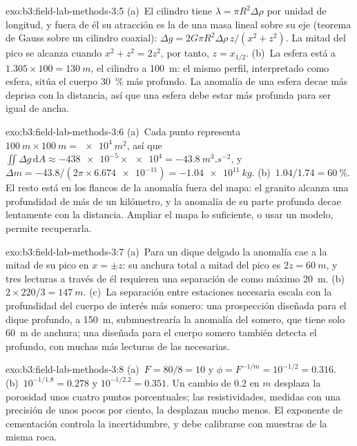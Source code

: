 \begin{solution}{exo:b3:field-lab-methods-3:5}
(a)~El cilindro tiene $\lambda = \pi R^2\Delta\rho$ por unidad de longitud, y
fuera de él su atracción es la de una masa lineal sobre su eje (teorema de Gauss
sobre un cilindro coaxial): $\Delta g = 2G\pi R^2\Delta\rho\,z/(x^2
+ z^2)$. La mitad del pico se alcanza cuando $x^2 + z^2 = 2z^2$, por tanto, $z =
x_{1/2}$. (b)~La esfera está a $1.305\times100 = \qty{130}{m}$, el
cilindro a \qty{100}{m}: el mismo perfil, interpretado como esfera, sitúa el
cuerpo \qty{30}{\percent} más profundo. La anomalía de una esfera decae más deprisa con
la distancia, así que una esfera debe estar más profunda para ser igual de ancha.
\end{solution}

\begin{solution}{exo:b3:field-lab-methods-3:6}
(a)~Cada punto representa $\qty{100}{m}\times\qty{100}{m} =
\qty{e4}{m^2}$, así que $\iint\Delta g\,\mathrm{d}A \approx
\num{-438e-5}\times\num{e4} = \qty{-43.8}{m^3.s^{-2}}$, y $\Delta m
= -43.8/(2\pi\times\num{6.674e-11}) = \qty{-1.04e11}{kg}$. (b)~$1.04/1.74
= \qty{60}{\percent}$. El resto está en los flancos de la anomalía fuera
del mapa: el granito alcanza una profundidad de más de un kilómetro, y la
anomalía de su parte profunda decae lentamente con la distancia. Ampliar el mapa
lo suficiente, o usar un modelo, permite recuperarla.
\end{solution}

\begin{solution}{exo:b3:field-lab-methods-3:7}
(a)~Para un dique delgado la anomalía cae a la mitad de su pico en $x = \pm z$:
su anchura total a mitad del pico es $2z = \qty{60}{m}$, y tres
lecturas a través de él requieren una separación de como máximo \qty{20}{m}. (b)~$2\times
220/3 = \qty{147}{m}$. (c)~La separación entre estaciones necesaria escala con la
profundidad del cuerpo de interés más somero: una prospección diseñada para el
dique profundo, a \qty{150}{m}, submuestrearía la anomalía del somero, que
tiene solo \qty{60}{m} de anchura; una diseñada para el cuerpo somero también detecta el
profundo, con muchas más lecturas de las necesarias.
\end{solution}

\begin{solution}{exo:b3:field-lab-methods-3:8}
(a)~$F = 80/8 = 10$ y $\phi = F^{-1/m} = 10^{-1/2} = \num{0.316}$.
(b)~$10^{-1/1.8} = \num{0.278}$ y $10^{-1/2.2} = \num{0.351}$. Un cambio
de \num{0.2} en $m$ desplaza la porosidad unos cuatro puntos porcentuales;
las resistividades, medidas con una precisión de unos pocos por ciento, la desplazan mucho menos. El
exponente de cementación controla la incertidumbre, y debe calibrarse
con muestras de la misma roca.
\end{solution}

